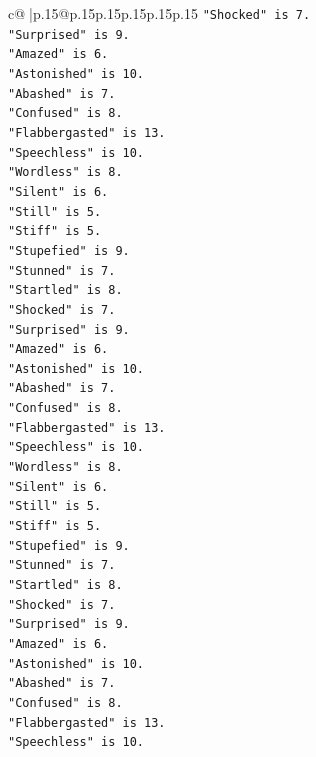 \documentclass{article}
\begin{document}
{\begin{supertabular}{c@{$\;$}|p{.15\linewidth}@{}p{.15\linewidth}p{.15\linewidth}p{.15\linewidth}p{.15\linewidth}p{.15\linewidth}}
{{{\texttt{"Shocked" is 7.} \\
\texttt{"Surprised" is 9.} \\
\texttt{"Amazed" is 6.} \\
\texttt{"Astonished" is 10.} \\
\texttt{"Abashed" is 7.} \\
\texttt{"Confused" is 8.} \\
\texttt{"Flabbergasted" is 13.} \\
\texttt{"Speechless" is 10.} \\
\texttt{"Wordless" is 8.} \\
\texttt{"Silent" is 6.} \\
\texttt{"Still" is 5.} \\
\texttt{"Stiff" is 5.} \\
\texttt{"Stupefied" is 9.} \\
\texttt{"Stunned" is 7.} \\
\texttt{"Startled" is 8.} \\
\texttt{"Shocked" is 7.} \\
\texttt{"Surprised" is 9.} \\
\texttt{"Amazed" is 6.} \\
\texttt{"Astonished" is 10.} \\
\texttt{"Abashed" is 7.} \\
\texttt{"Confused" is 8.} \\
\texttt{"Flabbergasted" is 13.} \\
\texttt{"Speechless" is 10.} \\
\texttt{"Wordless" is 8.} \\
\texttt{"Silent" is 6.} \\
\texttt{"Still" is 5.} \\
\texttt{"Stiff" is 5.} \\
\texttt{"Stupefied" is 9.} \\
\texttt{"Stunned" is 7.} \\
\texttt{"Startled" is 8.} \\
\texttt{"Shocked" is 7.} \\
\texttt{"Surprised" is 9.} \\
\texttt{"Amazed" is 6.} \\
\texttt{"Astonished" is 10.} \\
\texttt{"Abashed" is 7.} \\
\texttt{"Confused" is 8.} \\
\texttt{"Flabbergasted" is 13.} \\
\texttt{"Speechless" is 10.} \\
}}}
\end{supertabular}}
\end{document}
